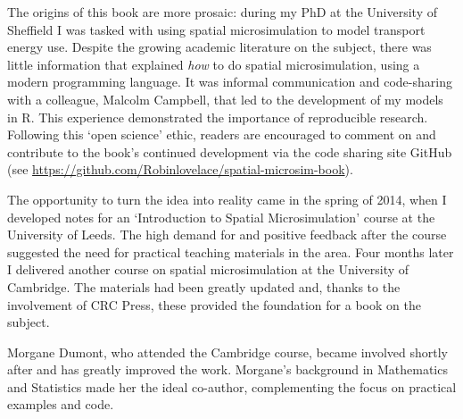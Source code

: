 The origins of this book are more prosaic: during my PhD at the University of Sheffield
I was tasked with using spatial microsimulation to model transport energy use.
Despite the growing academic literature on the subject,
there was little information that explained \emph{how} to do spatial microsimulation,
using a modern programming language.
It was informal communication and code-sharing with a colleague,
Malcolm Campbell, that led to the development of my models in R.
This experience demonstrated the importance of
reproducible research. Following this `open science' ethic,
readers are encouraged to comment on and contribute to
the book's continued development via the code sharing site GitHub
(see \url{https://github.com/Robinlovelace/spatial-microsim-book}).

The opportunity to turn the idea into reality came in the spring
of 2014, when I developed notes for an `Introduction to Spatial Microsimulation' course at
the University of Leeds.
The high demand for and positive feedback after the course
suggested the need for practical teaching materials in the area.
Four months later
I delivered another course on spatial microsimulation
at the University of Cambridge.
The materials had been greatly updated
and, thanks to the involvement of CRC Press, these
provided the foundation for a book on the subject.

Morgane Dumont, who attended the Cambridge course,
became involved shortly after and has greatly improved the work.
Morgane's background in Mathematics and Statistics made her the
ideal co-author, complementing the focus on practical examples
and code.

